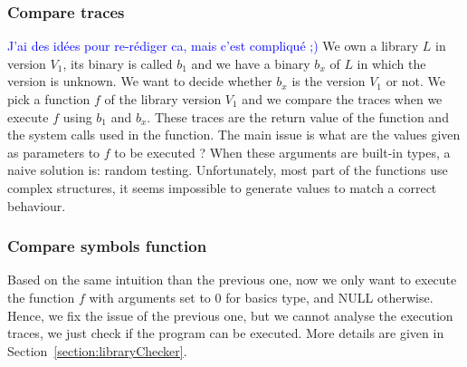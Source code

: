 \documentclass{article}
\newcommand{\ludo}[1]{\textcolor{blue}{#1}}
\newcommand{\symb}{{symbols}}
\newcommand{\comp}{{compilation}}
\begin{document}
	
	\subsubsection{Compare traces}


    \ludo{J'ai des idées pour re-rédiger ca, mais c'est compliqué ;)}
    We own a library $L$ in version $V_1$, its binary is called $b_1$ and we
    have a binary $b_x$ of $L$ in which the version is unknown. We want to
    decide whether $b_x$ is the version $V_1$ or not. We pick a function $f$
    of the library version $V_1$ and we compare the traces when we execute $f$
    using $b_1$ and $b_x$.	These traces are the return value of the function
    and the system calls used in the function.  The main issue is what are the
    values given as parameters to $f$ to be executed ? When these arguments
    are built-in types, a naive solution is: random testing. Unfortunately,
    most part of the functions use complex structures, it seems impossible to
    generate values to match a correct behaviour.
	
	\subsubsection{Compare symbols function}
	
    Based on the same intuition than the previous one, now we only want to
    execute the function $f$ with arguments set to $0$ for basics type, and
    NULL otherwise. Hence, we fix the issue of the previous one, but we cannot
    analyse the execution traces, we just check if the program can be
    executed. More details are given in Section~\ref{section:libraryChecker}.
\end{document}
